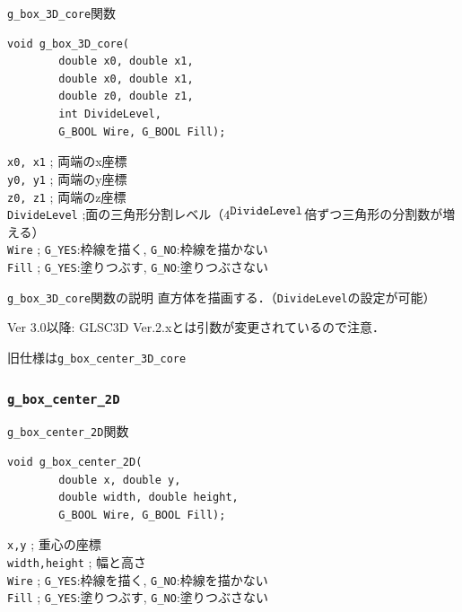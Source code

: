 \documentclass[platex,a4paper,12pt]{jsarticle}%
\begin{document}
\begin{itembox}[l]{\texttt{g\_box\_3D\_core}関数}
\begin{verbatim}
void g_box_3D_core(
        double x0, double x1,
        double x0, double x1,
        double z0, double z1,
        int DivideLevel,
        G_BOOL Wire, G_BOOL Fill);   
\end{verbatim}
\verb|x0, x1| ; 両端のx座標\\
\verb|y0, y1| ; 両端のy座標\\
\verb|z0, z1| ; 両端のz座標\\
\verb|DivideLevel| ;面の三角形分割レベル（$4^{\verb|DivideLevel|}$倍ずつ三角形の分割数が増える）\\
\verb|Wire| ; \verb|G_YES|:枠線を描く, \verb|G_NO|:枠線を描かない \\
\verb|Fill| ; \verb|G_YES|:塗りつぶす, \verb|G_NO|:塗りつぶさない
\end{itembox}

\begin{itembox}[l]{\texttt{g\_box\_3D\_core}関数の説明}
直方体を描画する．（\verb|DivideLevel|の設定が可能）

Ver 3.0以降: GLSC3D Ver.2.xとは引数が変更されているので注意．

旧仕様は\verb|g_box_center_3D_core|
\end{itembox}



\clearpage
\subsubsection{\texttt{g\_box\_center\_2D}}

\begin{itembox}[l]{\texttt{g\_box\_center\_2D}関数}
\begin{verbatim}
void g_box_center_2D(
        double x, double y,
        double width, double height,
        G_BOOL Wire, G_BOOL Fill);    
\end{verbatim}
\verb|x,y| ; 重心の座標\\
\verb|width,height| ; 幅と高さ\\
\verb|Wire| ; \verb|G_YES|:枠線を描く, \verb|G_NO|:枠線を描かない \\
\verb|Fill| ; \verb|G_YES|:塗りつぶす, \verb|G_NO|:塗りつぶさない
\end{itembox}
\end{document}
